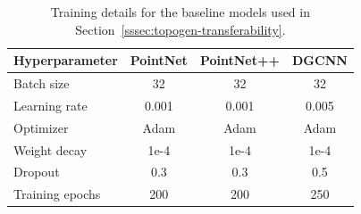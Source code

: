 \begin{table}[h!]
  \centering
  \begin{tabular}{l|ccc}
  \toprule
    Hyperparameter  & PointNet & PointNet++ & DGCNN\\
  \midrule
  Batch size              & 32    & 32    & 32    \\
  Learning rate           & 0.001 & 0.001 & 0.005 \\
  Optimizer               & Adam  & Adam  & Adam  \\
  Weight decay            & 1e-4  & 1e-4  & 1e-4  \\
  Dropout                 & 0.3   & 0.3   & 0.5   \\
  Training epochs         & 200   & 200   & 250   \\
  \bottomrule
  \end{tabular}
  \caption{Training details for the baseline models used in Section~\ref{sssec:topogen-transferability}.}
  \label{suppl:topogen-baseline-training}
\end{table}
